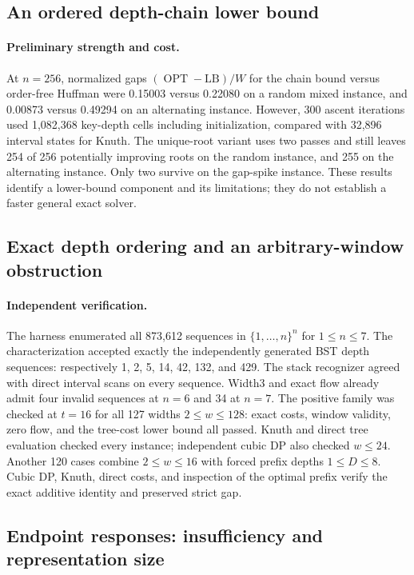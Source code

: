 \documentclass[11pt]{article}
\newcommand{\OPT}{\operatorname{OPT}}
\begin{document}
\subsection{An ordered depth-chain lower bound}
\paragraph{Preliminary strength and cost.}
At $n=256$, normalized gaps $(\OPT-\mathrm{LB})/W$ for the chain bound
versus order-free Huffman were 0.15003 versus 0.22080 on a random mixed
instance, and 0.00873 versus 0.49294 on an alternating instance.
However, 300 ascent iterations used 1,082,368 key-depth cells including
initialization, compared with 32,896 interval states for Knuth.
The unique-root variant uses two passes and still leaves 254 of 256
potentially improving roots on the random instance, and 255 on the
alternating instance. Only two survive on the gap-spike instance.
These results identify a lower-bound component and its limitations;
they do not establish a faster general exact solver.


\subsection{Exact depth ordering and an arbitrary-window obstruction}
\paragraph{Independent verification.}
The harness enumerated all 873,612 sequences in $\{1,\ldots,n\}^n$ for
$1\le n\le7$. The characterization accepted exactly the independently
generated BST depth sequences: respectively 1, 2, 5, 14, 42, 132, and 429.
The stack recognizer agreed with direct interval scans on every sequence.
Width3 and exact flow already admit four invalid sequences at $n=6$ and
34 at $n=7$. The positive family was checked at $t=16$ for all 127 widths
$2\le w\le128$: exact costs, window validity, zero flow, and the tree-cost
lower bound all passed. Knuth and direct tree evaluation checked every
instance; independent cubic DP also checked $w\le24$.
Another 120 cases combine $2\le w\le16$ with forced prefix depths
$1\le D\le8$. Cubic DP, Knuth, direct costs, and inspection of the optimal
prefix verify the exact additive identity and preserved strict gap.


\subsection{Endpoint responses: insufficiency and representation size}
\end{document}
